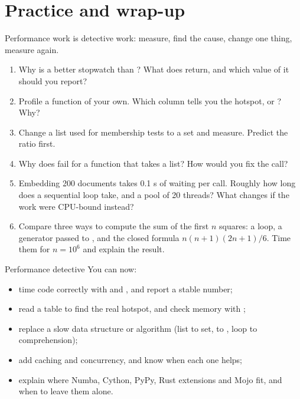 \section{Practice and wrap-up}

Performance work is detective work: measure, find the cause, change one thing, measure again.

\begin{practice}
\begin{enumerate}[leftmargin=*]
\item Why is  a better stopwatch than ? What does
 return, and which value of it should you report?
\item Profile a function of your own. Which column tells you the hotspot,  or
? Why?
\item Change a list used for membership tests to a set and measure. Predict the ratio first.
\item Why does  fail for a function that takes a list? How would you fix the call?
\item Embedding 200 documents takes 0.1 s of waiting per call. Roughly how long does a sequential
loop take, and a pool of 20 threads? What changes if the work were CPU-bound instead?
\item Compare three ways to compute the sum of the first $n$ squares: a  loop, a generator
passed to , and the closed formula $n(n+1)(2n+1)/6$. Time them for $n=10^6$ and explain the
result.
\end{enumerate}
\end{practice}

\begin{achievement}{Performance detective}
You can now:
\begin{itemize}[leftmargin=*]
\item time code correctly with  and , and report a stable number;
\item read a  table to find the real hotspot, and check memory with ;
\item replace a slow data structure or algorithm (list to set, \code{+=} to , loop to comprehension);
\item add caching and concurrency, and know when each one helps;
\item explain where Numba, Cython, PyPy, Rust extensions and Mojo fit, and when to leave them alone.
\end{itemize}
\end{achievement}
